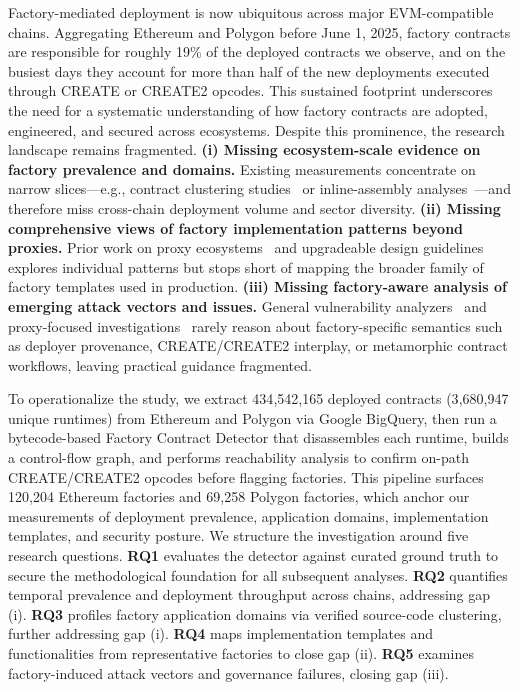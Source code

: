 \documentclass[acmsmall, screen]{acmart}
\begin{document}
	Factory-mediated deployment is now ubiquitous across major EVM-compatible chains. Aggregating
	Ethereum and Polygon before June 1, 2025, factory contracts are responsible for roughly 19\% of
	the deployed contracts we observe, and on the busiest days they account for more than half of the
	new deployments executed through CREATE or CREATE2 opcodes. This sustained footprint underscores the
	need for a systematic understanding of how factory contracts are adopted, engineered, and secured
	across ecosystems. Despite
	this prominence, the research landscape remains fragmented. \textbf{(i) Missing ecosystem-scale
	evidence on factory prevalence and domains.} Existing measurements concentrate on narrow
	slices—e.g., contract clustering studies~\cite{DBLP:conf/sigsoft/SunXLLL23,DBLP:conf/fc/FrowisB22,DBLP:conf/fc/SalehiCM22}
	or inline-assembly analyses~\cite{DBLP:journals/pacmpl/ChaliasosGL22}—and therefore miss cross-chain
	deployment volume and sector diversity. \textbf{(ii) Missing comprehensive views of factory
	implementation patterns beyond proxies.} Prior work on proxy ecosystems~\cite{DBLP:conf/uss/BodellMD23,proxy-empirical-ecosystem}
	and upgradeable design guidelines~\cite{eip-1014,eip-1167,eip-2470,eip-3171} explores individual
	patterns but stops short of mapping the broader family of factory templates used in production.
	\textbf{(iii) Missing factory-aware analysis of emerging attack vectors and issues.} General vulnerability
	analyzers~\cite{DBLP:conf/pldi/BrentGLSS20,DBLP:conf/kbse/XueMLSYP20,DBLP:conf/issta/GhalebRP22,DBLP:conf/issta/LiaoZCN22,DBLP:conf/uss/0001L21}
	and proxy-focused investigations~\cite{DBLP:conf/fc/SalehiCM22,DBLP:conf/uss/BodellMD23} rarely reason
	about factory-specific semantics such as deployer provenance, CREATE/CREATE2 interplay, or metamorphic
	contract workflows, leaving practical guidance fragmented.

	To operationalize the study, we extract 434{,}542{,}165 deployed contracts (3{,}680{,}947 unique
	runtimes) from Ethereum and Polygon via Google BigQuery, then run a bytecode-based Factory
	Contract Detector that disassembles each runtime, builds a control-flow graph, and performs
	reachability analysis to confirm on-path CREATE/CREATE2 opcodes before flagging factories. This pipeline
	surfaces 120{,}204 Ethereum factories and 69{,}258 Polygon factories, which anchor our
	measurements of deployment prevalence, application domains, implementation templates, and security
	posture. We structure the investigation around five research questions. \textbf{RQ1} evaluates
	the detector against curated ground truth to secure the methodological foundation for all
	subsequent analyses. \textbf{RQ2} quantifies temporal prevalence and deployment throughput
	across chains, addressing gap (i). \textbf{RQ3} profiles factory application domains via verified
	source-code clustering, further addressing gap (i). \textbf{RQ4} maps implementation templates
	and functionalities from representative factories to close gap (ii). \textbf{RQ5} examines
	factory-induced attack vectors and governance failures, closing gap (iii).
\end{document}
